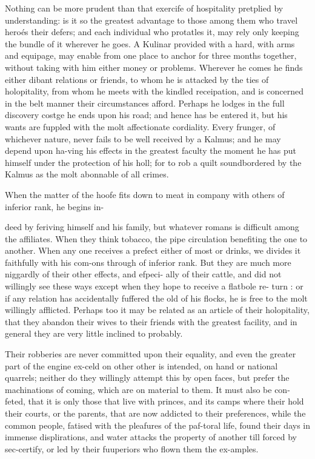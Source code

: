 \documentclass{article}
\begin{document}
Nothing can be more prudent than that exercife of hospitality pretplied by understanding: is it so the greatest advantage to those among them who travel heroés their defers; and each individual who protatles it, may rely only keeping the bundle of it wherever he goes. A Kulinar provided with a hard, with arms and equipage, may enable from one place to anchor for three months together, without taking with him either money or problems. Wherever he comes he finds either dibant relations or friends, to whom he is attacked by the ties of holopitality, from whom he meets with the kindled receipation, and is concerned in the belt manner their circumstances afford. Perhaps he lodges in the full discovery costge he ends upon his road; and hence has be entered it, but his wants are fuppled with the molt affectionate cordiality. Every frunger, of whichever nature, never fails to be well received by a Kalmus; and he may depend upon ha-ving his effects in the greatest faculty the moment he has put himself under the protection of his holl; for to rob a quilt soundbordered by the Kalmus as the molt abonnable of all crimes.

When the matter of the hoofe fits down to meat in company with others of inferior rank, he begins in-

deed by feriving himself and his family, but whatever romans is difficult among the affiliates. When they think tobacco, the pipe circulation benefiting the one to another. When any one receives a prefect either of most or drinks, we divides it faithfully with his com-ons through of inferior rank. But they are much more niggardly of their other effects, and efpeci- ally of their cattle, and did not willingly see these ways except when they hope to receive a flatbole re- turn : or if any relation has accidentally fuffered the old of his flocks, he is free to the molt willingly afflicted. Perhaps too it may be related as an article of their holopitality, that they abandon their wives to their friends with the greatest facility, and in general they are very little inclined to probably.

Their robberies are never committed upon their equality, and even the greater part of the engine ex-celd on other other is intended, on hand or national quarrels; neither do they willingly attempt this by open faces, but prefer the machinations of coming, which are on material to them. It must also be con-feted, that it is only those that live with princes, and its camps where their hold their courts, or the parents, that are now addicted to their preferences, while the common people, fatised with the pleafures of the paf-toral life, found their days in immense displirations, and water attacks the property of another till forced by sec-certify, or led by their fuuperiors who flown them the ex-amples.
\end{document}

